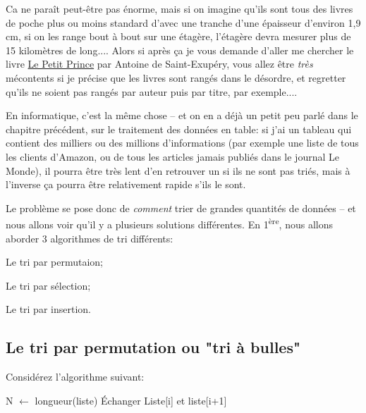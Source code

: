 \documentclass[12pt]{article}
\begin{document}
	Ca ne paraît peut-être pas énorme, mais si on imagine qu'ils sont tous des livres de poche plus ou moins standard d'avec une tranche d'une épaisseur d'environ 1,9 cm, si on les range bout à bout sur une étagère, l'étagère devra mesurer plus de 15 kilomètres de long.... Alors si après ça je vous demande d'aller me chercher le livre \uline{Le Petit Prince} par Antoine de Saint-Exupéry, vous allez être \textit{très} mécontents si je précise que les livres sont rangés dans le désordre, et regretter qu'ils ne soient pas rangés par auteur puis par titre, par exemple.... 
	
	En informatique, c'est la même chose -- et on en a déjà un petit peu parlé dans le chapitre précédent, sur le traitement des données en table: si j'ai un tableau qui contient des milliers ou des millions d'informations (par exemple une liste de tous les clients d'Amazon, ou de tous les articles jamais publiés dans le journal Le Monde), il pourra être très lent d'en retrouver un si ils ne sont pas triés, mais à l'inverse ça pourra être relativement rapide s'ils le sont.
	
	Le problème se pose donc de \textit{comment} trier de grandes quantités de données -- et nous allons voir qu'il y a plusieurs solutions différentes. En 1\textsuperscript{ère}, nous allons aborder 3 algorithmes de tri différents:
	\begin{alphenum}
		\item Le tri par permutaion;
		\item Le tri par sélection;
		\item Le tri par insertion.
	\end{alphenum}
	
	\subsection{Le tri par permutation ou "tri à bulles"}
	Considérez l'algorithme suivant:
	\begin{algorithmic}[1]
		\State N $\leftarrow$ longueur(liste)
		\State Échanger Liste[i] et liste[i+1]
		\EndIf
		\EndFor
		\State{}
		\EndFunction
	\end{algorithmic}
	
\end{document}
